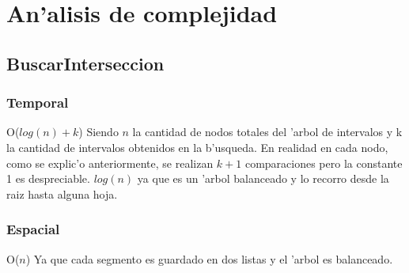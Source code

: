 \section{An'alisis de complejidad}
\subsection{BuscarInterseccion}
\subsubsection{Temporal}
O($log(n)+k$)
Siendo $n$ la cantidad de nodos totales del 'arbol de intervalos y k la cantidad de intervalos obtenidos en la b'usqueda. 
En realidad en cada nodo, como se explic'o anteriormente, se realizan $k+1$ comparaciones pero la constante 1 es despreciable.
$log(n)$ ya que es un 'arbol balanceado y lo recorro desde la raiz hasta alguna hoja.

\subsubsection{Espacial}
O($n$) 
Ya que cada segmento es guardado en dos listas y el 'arbol es balanceado.
